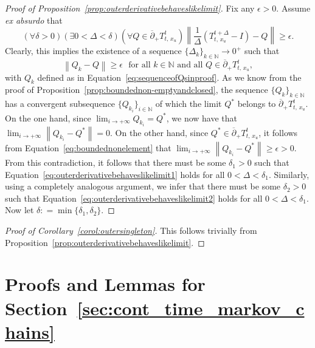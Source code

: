 \documentclass[10pt,a4paper]{paper}
\theoremstyle{definition}
\newcommand{\nats}{\mathbb{N}}
\newcommand{\norm}[1]{\left\lVert #1 \right\rVert}
\newcommand{\coloneqq}{:\!=}
\begin{document}
\begin{proof}[Proof of Proposition~\ref{prop:outerderivativebehaveslikelimit}]
Fix any $\epsilon>0$.
Assume \emph{ex absurdo} that
\begin{equation*}
(\forall\delta>0)(\exists0<\Delta<\delta)
(\forall Q\in\overline{\partial}_{+}
{T^t_{t,\,x_u}})
\norm{\frac{1}{\Delta}
(T^{t+\Delta}_{t,\,x_u}-I)-Q}\geq\epsilon.
\end{equation*}
Clearly, this implies the existence of a sequence $\{\Delta_k\}_{k\in\nats}\to0^+$ such that
\begin{equation}\label{eq:boundednonelement}
\norm{Q_k-Q}\geq\epsilon
\text{~~for all $k\in\nats$ and all $Q\in\overline{\partial}_{+}
{T^t_{t,\,x_u}}$},
\end{equation}
with $Q_k$ defined as in Equation~\eqref{eq:sequenceofQsinproof}. As we know from the proof of Proposition~\ref{prop:boundednon-emptyandclosed}, the sequence $\{Q_k\}_{k\in\nats}$ has a convergent subsequence $\{Q_{k_i}\}_{i\in\nats}$ of which the limit $Q^*$ belongs to $\overline{\partial}_{+}
{T^t_{t,\,x_u}}$. On the one hand, since $\lim_{i\to+\infty}Q_{k_i}=Q^*$, we now have that $\lim_{i\to+\infty}\norm{Q_{k_i}-Q^*}=0$. On the other hand, since $Q^*\in\overline{\partial}_{+}
{T^t_{t,\,x_u}}$, it follows from Equation~\eqref{eq:boundednonelement} that $\lim_{i\to+\infty}\norm{Q_{k_i}-Q^*}\geq\epsilon>0$. From this contradiction, it follows that there must be some $\delta_1>0$ such that Equation~\eqref{eq:outerderivativebehaveslikelimit1} holds for all $0<\Delta<\delta_1$. Similarly, using a completely analogous argument, we infer that there must be some $\delta_2>0$ such that Equation~\eqref{eq:outerderivativebehaveslikelimit2} holds for all $0<\Delta<\delta_1$. Now let $\delta\coloneqq\min\{\delta_1,\delta_2\}$.
\end{proof}

\begin{proof}[Proof of Corollary~\ref{corol:outersingleton}]
This follows trivially from Proposition~\ref{prop:outerderivativebehaveslikelimit}.
\end{proof}

\section{Proofs and Lemmas for Section~\ref{sec:cont_time_markov_chains}}
\end{document}

